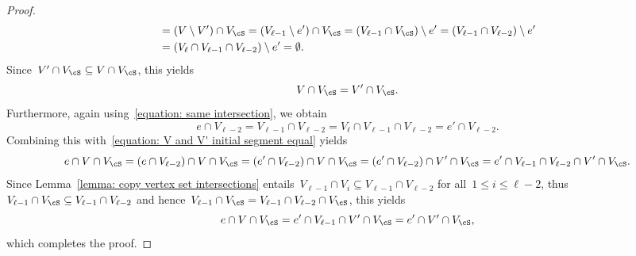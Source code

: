 \documentclass[11pt]{amsart}
\theoremstyle{definition}
\numberwithin{equation}{section}
\begin{document}
\begin{proof}
\begin{equation*}
\begin{aligned}
				&=(V\setminus V')\cap V_\cS
				=(V_{\ell-1}\setminus e')\cap V_\cS
				=(V_{\ell-1}\cap V_\cS)\setminus e'
				=(V_{\ell-1}\cap V_{\ell-2})\setminus e'\\
				&=(V_{\ell}\cap V_{\ell-1}\cap V_{\ell-2})\setminus e'
				=\emptyset.
			\end{aligned}
		\end{equation*}
		Since~$V'\cap V_\cS\subseteq V\cap V_\cS$, this yields
		\begin{equation}\label{equation: V and V' initial segment equal}
			V\cap V_\cS=V'\cap V_\cS.
		\end{equation}
		Furthermore, again using~\eqref{equation: same intersection}, we obtain
		\begin{equation*}
			e\cap V_{\ell-2}
			=V_{\ell-1}\cap V_{\ell-2}
			=V_\ell\cap V_{\ell-1}\cap V_{\ell-2}
			=e'\cap V_{\ell-2}.
		\end{equation*}
		Combining this with~\eqref{equation: V and V' initial segment equal} yields
		\begin{equation*}
			e\cap V\cap V_\cS
			=(e\cap V_{\ell-2})\cap V\cap V_\cS
			=(e'\cap V_{\ell-2})\cap V\cap V_\cS
			=(e'\cap V_{\ell-2})\cap V'\cap V_\cS
			=e'\cap V_{\ell-1}\cap V_{\ell-2}\cap V'\cap V_\cS.
		\end{equation*}
		Since Lemma~\ref{lemma: copy vertex set intersections} entails~$V_{\ell-1}\cap V_i\subseteq V_{\ell-1}\cap V_{\ell-2}$ for all~$1\leq i\leq \ell-2$, thus~$V_{\ell-1}\cap V_\cS\subseteq V_{\ell-1}\cap V_{\ell-2}$ and hence~$V_{\ell-1}\cap V_\cS= V_{\ell-1}\cap V_{\ell-2}\cap V_\cS$, this yields
		\begin{equation*}
			e\cap V\cap V_\cS=e'\cap V_{\ell-1}\cap V'\cap V_\cS=e'\cap V'\cap V_\cS,
		\end{equation*}
		which completes the proof.
	\end{proof}
	
\end{document}
